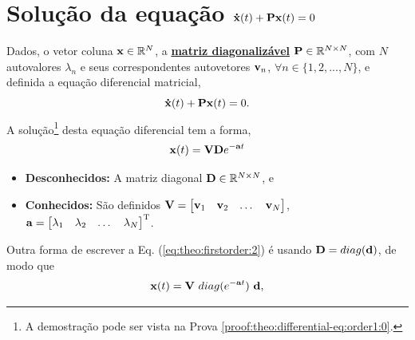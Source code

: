 \section{ Solução da equação $\DTVECTOR{x}(t) + \MATRIX{P} \VECTOR{x}(t)=0$ }

\begin{theorem}[Equação 
$\DTVECTOR{x}(t) + \MATRIX{P} \VECTOR{x}(t)=0$ com matriz $\MATRIX{P}$ diagonalizável:]
\label{theo:differential-eq:order1:0}
Dados, o vetor coluna $\VECTOR{x} \in \mathbb{R}^N$, 
a \hyperref[def:diagonalization0]{\textbf{matriz diagonalizável}} $\MATRIX{P} \in \mathbb{R}^{N\times N}$,
com $N$ autovalores $\lambda_n$ e seus correspondentes autovetores $\VECTOR{v}_n$,
$\forall n \in \{1, 2, ..., N\}$, 
e definida a equação diferencial matricial,
\begin{equation}
\DTVECTOR{x}(t) + \MATRIX{P} \VECTOR{x}(t)=0.
\end{equation}
A solução\footnote{A
demostração pode ser vista na Prova \ref{proof:theo:differential-eq:order1:0}.} desta equação diferencial tem  a forma,
\begin{equation}\label{eq:theo:firstorder:2}
 \VECTOR{x}(t)= \MATRIX{V}\MATRIX{D} e^{-\VECTOR{a}t}
\end{equation}
\begin{itemize}
\item \textbf{Desconhecidos:} A matriz diagonal $\MATRIX{D} \in \mathbb{R}^{N \times N}$, e
\item  \textbf{Conhecidos:} São definidos $\MATRIX{V}=
\begin{bmatrix}
\VECTOR{v}_1 & \VECTOR{v}_2 & \dots & \VECTOR{v}_N
\end{bmatrix}$, 
$\VECTOR{a}=
\begin{bmatrix}
\lambda_1 & \lambda_2 & \dots & \lambda_N
\end{bmatrix}^{\transpose}$.
\end{itemize}
\end{theorem}

\begin{corollary}
\label{coro:differential-eq:order1:0}
Outra forma de escrever a Eq. (\ref{eq:theo:firstorder:2}) é usando $\MATRIX{D}=\funcdiag(\VECTOR{d})$, de modo que
\begin{equation}\label{eq:coro:firstorder:1}
 \VECTOR{x}(t)= \MATRIX{V}~\funcdiag(e^{-\VECTOR{a}t})~\VECTOR{d},
\end{equation}
\end{corollary}

